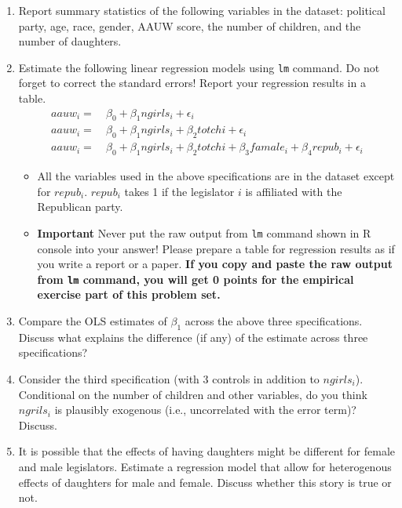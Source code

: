 \documentclass[]{book}
\providecommand{\tightlist}{%
  \setlength{\itemsep}{0pt}\setlength{\parskip}{0pt}}
\begin{document}
\begin{enumerate}
\def\labelenumi{\arabic{enumi}.}
\tightlist
\item
  Report summary statistics of the following variables in the dataset:
  political party, age, race, gender, AAUW score, the number of
  children, and the number of daughters.
\item
  Estimate the following linear regression models using \texttt{lm}
  command. Do not forget to correct the standard errors! Report your
  regression results in a table. \[
  \begin{aligned}
  aauw_i = \ & \beta_0 + \beta_1 ngirls_i + \epsilon_i \\
  aauw_i = \ & \beta_0 + \beta_1 ngirls_i + \beta_2 totchi + \epsilon_i \\
  aauw_i = \ & \beta_0 + \beta_1 ngirls_i + \beta_2 totchi + \beta_3 famale_i + \beta_4 repub_i + \epsilon_i 
  \end{aligned}
  \]

  \begin{itemize}
  \tightlist
  \item
    All the variables used in the above specifications are in the
    dataset except for \(repub_i\). \(repub_i\) takes 1 if the
    legislator \(i\) is affiliated with the Republican party.
  \item
    \textbf{Important} Never put the raw output from \texttt{lm} command
    shown in R console into your answer! Please prepare a table for
    regression results as if you write a report or a paper. \textbf{If
    you copy and paste the raw output from \texttt{lm} command, you will
    get 0 points for the empirical exercise part of this problem set.}
  \end{itemize}
\item
  Compare the OLS estimates of \(\beta_1\) across the above three
  specifications. Discuss what explains the difference (if any) of the
  estimate across three specifications?
\item
  Consider the third specification (with 3 controls in addition to
  \(ngirls_i\)). Conditional on the number of children and other
  variables, do you think \(ngrils_i\) is plausibly exogenous (i.e.,
  uncorrelated with the error term)? Discuss.
\item
  It is possible that the effects of having daughters might be different
  for female and male legislators. Estimate a regression model that
  allow for heterogenous effects of daughters for male and female.
  Discuss whether this story is true or not.
\end{enumerate}
\end{document}
